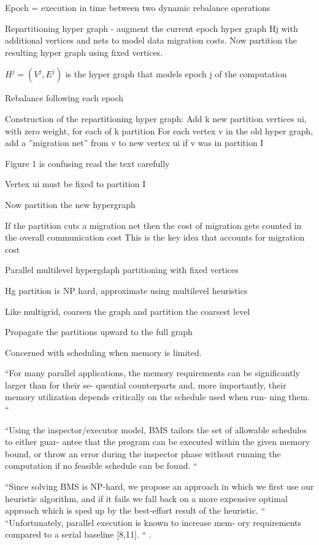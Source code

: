 \documentclass{article}
\begin{document}
Epoch = execution in time between two dynamic rebalance operations

Repartitioning hyper graph - augment the current epoch hyper graph Hj with additional vertices and nets to model data migration costs.  Now partition the resulting hyper graph using fixed vertices.

$H^j = (V^j, E^j)$ is the hyper graph that models epoch j of the computation

Rebalance following each epoch

Construction of the repartitioning hyper graph:
Add k new partition vertices ui, with zero weight, for each of k partition
For each vertex v in the old hyper graph, add a ”migration net” from v to new vertex ui if v was in partition I

Figure 1 is confusing read the text carefully

Vertex ui must be fixed to partition I

Now partition the new hypergraph

If the partition cuts a migration net then the cost of migration gets counted in the overall communication cost
This is the key idea that accounts for migration cost

Parallel multilevel hypergdaph partitioning with fixed vertices

Hg partition is NP hard, approximate using multilevel heuristics

Like multigrid,  coarsen the graph and partition the coarsest level

Propagate the partitions upward to the full graph


\cite{doi:10.1142/S0129054197000215}


\cite{Sbirlea:2014:BMS:2628071.2628090}


Concerned with scheduling when memory is limited.

“For many parallel applications, the memory requirements can be significantly larger than for their se- quential counterparts and, more importantly, their memory utilization depends critically on the schedule used when run- ning them. “

“Using the inspector/executor model, BMS tailors the set of allowable schedules to either guar- antee that the program can be executed within the given memory bound, or throw an error during the inspector phase without running the computation if no feasible schedule can be found. “

“Since solving BMS is NP-hard, we propose an approach in which we first use our heuristic algorithm, and if it fails we fall back on a more expensive optimal approach which is sped up by the best-effort result of the heuristic. “
“Unfortunately, parallel execution is known to increase mem- ory requirements compared to a serial baseline [8,11]. “	.	
\end{document}
